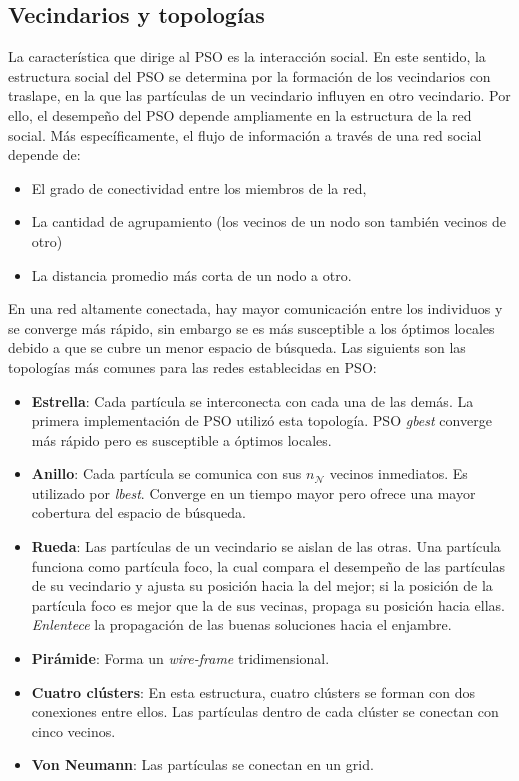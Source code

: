 \documentclass{article}
\begin{document}
\subsection{Vecindarios y topologías}
La característica que dirige al PSO es la interacción social.
En este sentido, la estructura social del PSO se determina por la formación de los vecindarios con traslape, en la que las partículas de un vecindario influyen en otro vecindario.
Por ello, el desempeño del PSO depende ampliamente en la estructura de la red social.
Más específicamente, el flujo de información a través de una red social depende de:
\begin{itemize}
	\item El grado de conectividad entre los miembros de la red,
	\item La cantidad de agrupamiento (los vecinos de un nodo son también vecinos de otro)
	\item La distancia promedio más corta de un nodo a otro.
\end{itemize}

En una red altamente conectada, hay mayor comunicación entre los individuos y se converge más rápido, sin embargo se es más susceptible a los óptimos locales debido a que se cubre un menor espacio de búsqueda.
Las siguients son las topologías más comunes para las redes establecidas en PSO:
\begin{itemize}
	\item \textbf{Estrella}: Cada partícula se interconecta con cada una de las demás.
	La primera implementación de PSO utilizó esta topología.
	PSO \emph{gbest} converge más rápido pero es susceptible a óptimos locales.
	\item \textbf{Anillo}: Cada partícula se comunica con sus $n_\mathcal{N}$ vecinos inmediatos.
	Es utilizado por \emph{lbest}. Converge en un tiempo mayor pero ofrece una mayor cobertura del espacio de búsqueda.
	\item \textbf{Rueda}: Las partículas de un vecindario se aislan de las otras.
	Una partícula funciona como partícula foco, la cual compara el desempeño de las partículas de su vecindario y ajusta su posición hacia la del mejor; si la posición de la partícula foco es mejor que la de sus vecinas, propaga su posición hacia ellas.
	\emph{Enlentece} la propagación de las buenas soluciones hacia el enjambre.
	\item \textbf{Pirámide}: Forma un \emph{wire-frame} tridimensional.
	\item \textbf{Cuatro clústers}: En esta estructura, cuatro clústers se forman con dos conexiones entre ellos.
	Las partículas dentro de cada clúster se conectan con cinco vecinos.
	\item \textbf{Von Neumann}: Las partículas se conectan en un grid.
\end{itemize}



\nocite{*}

 
\end{document}
